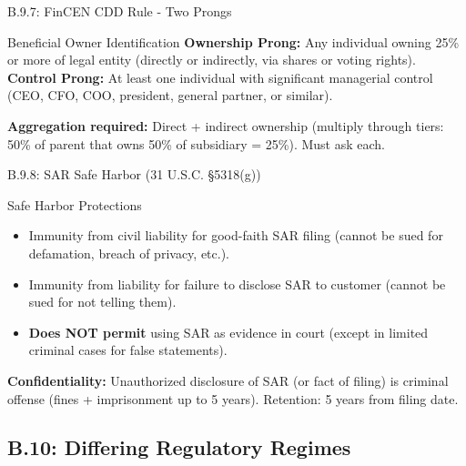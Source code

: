 \documentclass{beamer}
\begin{document}
	\begin{frame}{B.9.7: FinCEN CDD Rule - Two Prongs}
		\begin{block}{Beneficial Owner Identification}
			\textbf{Ownership Prong:} Any individual owning 25\% or more of legal entity (directly or indirectly, via shares or voting rights).
			\vspace{0.2cm}
			\textbf{Control Prong:} At least one individual with significant managerial control (CEO, CFO, COO, president, general partner, or similar).
		\end{block}
		\textbf{Aggregation required:} Direct + indirect ownership (multiply through tiers: 50\% of parent that owns 50\% of subsidiary = 25\%). Must ask each.
	\end{frame}
	
	\begin{frame}{B.9.8: SAR Safe Harbor (31 U.S.C. §5318(g))}
		\begin{block}{Safe Harbor Protections}
			\begin{itemize}
				\item Immunity from civil liability for good-faith SAR filing (cannot be sued for defamation, breach of privacy, etc.).
				\item Immunity from liability for failure to disclose SAR to customer (cannot be sued for not telling them).
				\item \textbf{Does NOT permit} using SAR as evidence in court (except in limited criminal cases for false statements).
			\end{itemize}
		\end{block}
		\textbf{Confidentiality:} Unauthorized disclosure of SAR (or fact of filing) is criminal offense (fines + imprisonment up to 5 years). Retention: 5 years from filing date.
	\end{frame}
	
	\subsection{B.10: Differing Regulatory Regimes}
	
\end{document}
